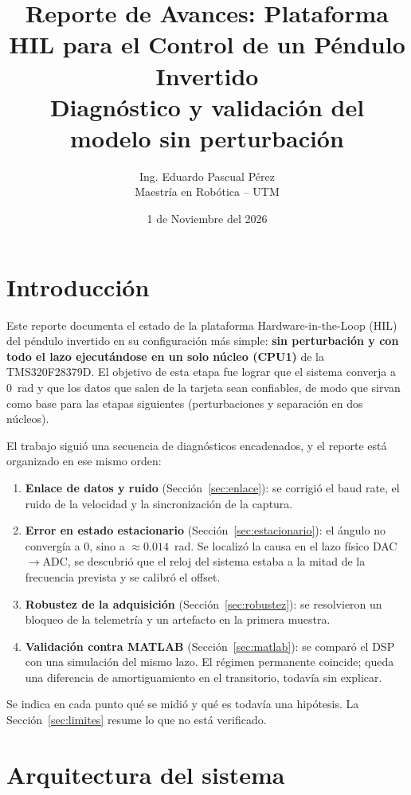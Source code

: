 \documentclass[11pt,a4paper]{article}
\title{\textbf{Reporte de Avances: Plataforma HIL para el Control de un Péndulo Invertido\\ Diagnóstico y validación del modelo sin perturbación}}
\author{Ing. Eduardo Pascual Pérez\\Maestría en Robótica -- UTM}
\date{1 de Noviembre del 2026}
\begin{document}
\maketitle

\section{Introducción}

Este reporte documenta el estado de la plataforma Hardware-in-the-Loop (HIL) del péndulo invertido en su configuración más simple: \textbf{sin perturbación y con todo el lazo ejecutándose en un solo núcleo (CPU1)} de la TMS320F28379D. El objetivo de esta etapa fue lograr que el sistema converja a 0~rad y que los datos que salen de la tarjeta sean confiables, de modo que sirvan como base para las etapas siguientes (perturbaciones y separación en dos núcleos).

El trabajo siguió una secuencia de diagnósticos encadenados, y el reporte está organizado en ese mismo orden:

\begin{enumerate}
    \item \textbf{Enlace de datos y ruido} (Sección~\ref{sec:enlace}): se corrigió el baud rate, el ruido de la velocidad y la sincronización de la captura.
    \item \textbf{Error en estado estacionario} (Sección~\ref{sec:estacionario}): el ángulo no convergía a 0, sino a $\approx 0.014$~rad. Se localizó la causa en el lazo físico DAC$\rightarrow$ADC, se descubrió que el reloj del sistema estaba a la mitad de la frecuencia prevista y se calibró el offset.
    \item \textbf{Robustez de la adquisición} (Sección~\ref{sec:robustez}): se resolvieron un bloqueo de la telemetría y un artefacto en la primera muestra.
    \item \textbf{Validación contra MATLAB} (Sección~\ref{sec:matlab}): se comparó el DSP con una simulación del mismo lazo. El régimen permanente coincide; queda una diferencia de amortiguamiento en el transitorio, todavía sin explicar.
\end{enumerate}

Se indica en cada punto qué se midió y qué es todavía una hipótesis. La Sección~\ref{sec:limites} resume lo que no está verificado.

\section{Arquitectura del sistema}
\end{document}
